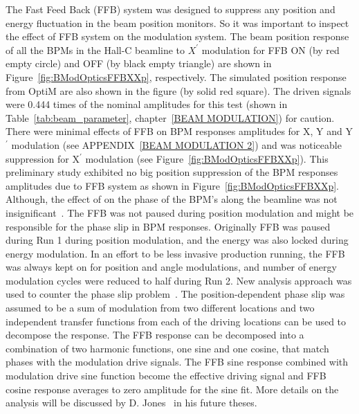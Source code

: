 The Fast Feed Back (FFB) system was designed to suppress any position and energy fluctuation in the beam position monitors. So it was important to inspect the effect of FFB system on the modulation system. The beam position response of all the BPMs in the Hall-C beamline to $X^{\prime}$ modulation for FFB ON (by red empty circle) and OFF (by black empty triangle) are shown in Figure~\ref{fig:BModOpticsFFBXXp}, respectively. The simulated position response from OptiM are also shown in the figure (by solid red square). The driven signals were 0.444 times of the nominal amplitudes for this test (shown in Table~\ref{tab:beam_parameter}, chapter~\ref{BEAM MODULATION}) for caution.
There were minimal effects of FFB on BPM responses amplitudes for X, Y and Y$^\prime$ modulation (see APPENDIX~\ref{BEAM MODULATION 2}) and was noticeable suppression for X$^\prime$ modulation (see Figure~\ref{fig:BModOpticsFFBXXp}). This preliminary study exhibited no big position suppression of the BPM responses amplitudes due to FFB system as shown in Figure~\ref{fig:BModOpticsFFBXXp}. Although, the effect of on the phase of the BPM's along the beamline was not insignificant~\cite{elog:josh_analysis690}. The FFB was not paused during position modulation and might be responsible for the phase slip in BPM responses. Originally FFB was paused during Run 1 during position modulation, and the energy was also locked during energy modulation. In an effort to be less invasive production running, the FFB was always kept on for position and angle modulations, and number of energy modulation cycles were reduced to half during Run 2. New analysis approach was used to counter the phase slip problem~\cite{elog:kent_analysis695}. The position-dependent phase slip was assumed to be a sum of modulation from two different locations and two independent transfer functions from each of the driving locations can be used to decompose the response. The FFB response can be decomposed into a combination of two harmonic functions, one sine and one cosine, that match phases with the modulation drive signals. The FFB sine response combined with modulation drive sine function become the effective driving signal and FFB cosine response averages to zero amplitude for the sine fit. More details on the analysis will be discussed by D. Jones~\cite{don_thesis} in his future theses.



